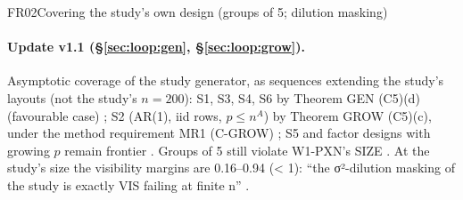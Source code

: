 \begin{card}{FR02}{Covering the study's own design (groups of 5; dilution masking)}
\paragraph{Update v1.1 (\S\ref{sec:loop:gen}, \S\ref{sec:loop:grow}).} Asymptotic coverage of the study generator, as sequences extending the study's layouts (not the study's $n=200$): S1, S3, S4, S6 by Theorem GEN (C5)(d) (favourable case) ; S2 (AR(1), iid rows, $p\le n^A$) by Theorem GROW (C5)(c), under the method requirement MR1 (C-GROW) ; S5 and factor designs with growing $p$ remain frontier . Groups of 5 still violate W1-PXN's SIZE . At the study's size the visibility margins are 0.16–0.94 (< 1): ``the σ²-dilution masking of the study is exactly VIS failing at finite n'' .

\end{card}

